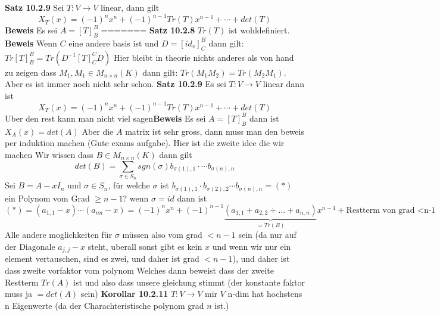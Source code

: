 \documentclass{article}
\begin{document}
\textbf{Satz 10.2.9} Sei $T:V\rightarrow V$ linear, dann gilt \[X_T(x)=(-1)^nx^n +(-1)^{n-1}Tr(T)x^{n-1}+\cdots+det(T)\]
\newline \textbf{Beweis} Es sei $A=[T]^B_B$
=======
\textbf{Satz 10.2.8} $Tr(T)$ ist wohldefiniert.
\newline\textbf{Beweis} Wenn $C$ eine andere basis ist und $D=\left[id_v\right]^B_C$ dann gilt: $Tr[T]^B_B=Tr(D^{-1}[T]^C_CD)$
\newline Hier bleibt in theorie nichts anderes als von hand zu zeigen dass $M_1,M_1\in M_{n\times n}(K)$ dann gilt: $Tr(M_1M_2)=Tr(M_2M_1)$. Aber es ist immer noch nicht sehr schon.
\newline\textbf{Satz 10.2.9} Es sei $T:V\rightarrow V$ linear dann ist \[X_T(x)=(-1)^nx^n+(-1)^{n-1}Tr(T)x^{n-1}+\cdots+det(T)\] Uber den rest kann man nicht viel sagen\newline\textbf{Beweis}
Es sei $A=[T]^B_B$ dann ist $X_A(x)=det(A)$ Aber die $A$ matrix ist sehr gross, dann muss man den beweis per induktion machen (Gute exams aufgabe). Hier ist die zweite idee die wir machen Wir wissen dass $B\in M_{n\times n}(K)$ dann gilt 
\[det(B)=\sum_{\sigma\in S_n}sgn(\sigma)b_{\sigma(1),1}\cdot\cdots b_{\sigma(n),n}\] Sei $B=A-xI_n$ und $\sigma\in S_n$, für welche $\sigma$ ist $b_{\sigma(1),1}\cdot b_{\sigma(2),2}\cdots b_{\sigma(n),n}=(*)$ ein Polynom vom Grad $\ge n-1$?
wenn $\sigma=id$ dann ist \[(*)=(a_{1,1}-x)\cdots(a_{nn}-x)=(-1)^nx^n+(-1)^{n-1}\underset{=Tr(B)}{\underbrace{(a_{1,1}+a_{2,2}+...+a_{n,n})}}x^{n-1}+\text{Restterm von grad <n-1}\] Alle andere moglichkeiten für $\sigma$ müssen also vom grad $<n-1$ sein (da nur auf der Diagonale $a_{j,j}-x$ steht, uberall sonst gibt es kein $x$ und wenn wir nur ein element vertauschen, sind es zwei, und daher ist grad $<n-1$), und daher ist dass zweite vorfaktor vom polynom
Welches dann beweist dass der zweite Restterm $Tr(A)$ ist und also dass unsere gleichung stimmt (der konstante faktor muss ja $=det(A)$ sein)
\newline\textbf{Korollar 10.2.11} $T:V\rightarrow V$ mir $V$ n-dim hat hochstens n Eigenwerte (da der Charachteristische polynom grad $n$ ist.)\newline
\end{document}
